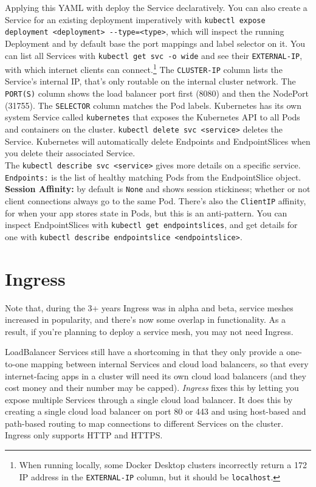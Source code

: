 \documentclass[8pt, table, xcdraw]{article}%
\begin{document}
Applying this YAML with deploy the Service declaratively. You can also create a Service for an existing deployment imperatively with \lstinline{kubectl expose deployment <deployment> --type=<type>}, which will inspect the running Deployment and by default base the port mappings and label selector on it. You can list all Services with \lstinline{kubectl get svc -o wide} and see their \lstinline{EXTERNAL-IP}, with which internet clients can connect.\footnote{When running locally, some Docker Desktop clusters incorrectly return a 172 IP address in the \lstinline{EXTERNAL-IP} column, but it should be \lstinline{localhost}.} The \lstinline{CLUSTER-IP} column lists the Service’s internal IP, that’s only routable on the internal cluster network. The \lstinline{PORT(S)} column shows the load balancer port first (8080) and then the NodePort (31755). The \lstinline{SELECTOR} column matches the Pod labels. Kubernetes has its own system Service called \lstinline{kubernetes} that exposes the Kubernetes API to all Pods and containers on the cluster. \lstinline{kubectl delete svc <service>} deletes the Service. Kubernetes will automatically delete Endpoints and EndpointSlices when you delete their associated Service.\\
The \lstinline{kubectl describe svc <service>} gives more details on a specific service. \lstinline{Endpoints:} is the list of healthy matching Pods from the EndpointSlice object. \textbf{Session Affinity:} by default is \lstinline{None} and shows session stickiness; whether or not client connections always go to the same Pod. There's also the \lstinline{ClientIP} affinity, for when your app stores state in Pods, but this is an anti-pattern. You can inspect EndpointSlices with \lstinline{kubectl get endpointslices}, and get details for one with \lstinline{kubectl describe endpointslice <endpointslice>}.

\section{Ingress}

Note that, during the 3+ years Ingress was in alpha and beta, service meshes increased in popularity, and there’s now some overlap in functionality. As a result, if you’re planning to deploy a service mesh, you may not need Ingress.

LoadBalancer Services still have a shortcoming in that they only provide a one-to-one mapping between internal Services and cloud load balancers, so that every internet-facing apps in a cluster will need its own cloud load balancers (and they cost money and their number may be capped). \emph{Ingress} fixes this by letting you expose multiple Services through a single cloud load balancer. It does this by creating a single cloud load balancer on port 80 or 443 and using host-based and path-based routing to map connections to different Services on the cluster. Ingress only supports HTTP and HTTPS.
\end{document}
